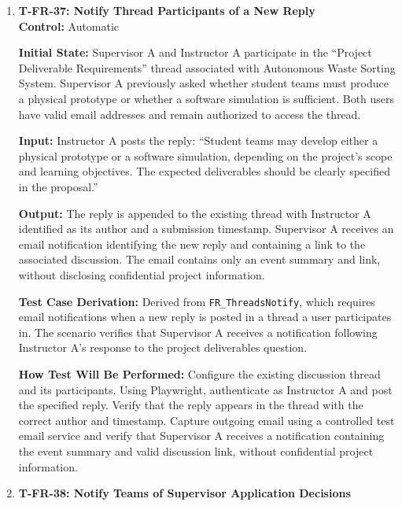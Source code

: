 \documentclass[12pt, titlepage]{article}
\begin{document}
\begin{enumerate}
\textbf{How Test Will Be Performed:} Using Playwright, authenticate as Student A and create both threads. Authenticate as Student B to reply to the team formation thread. Verify the content, authors, replies, and correct record associations.

\item \label{T-FR-37}\textbf{T-FR-37: Notify Thread Participants of a New Reply}\\

\textbf{Control:} Automatic

\textbf{Initial State:} Supervisor A and Instructor A participate in the ``Project Deliverable Requirements'' thread associated with Autonomous Waste Sorting System. Supervisor A previously asked whether student teams must produce a physical prototype or whether a software simulation is sufficient. Both users have valid email addresses and remain authorized to access the thread.

\textbf{Input:} Instructor A posts the reply: ``Student teams may develop either a physical prototype or a software simulation, depending on the project's scope and learning objectives. The expected deliverables should be clearly specified in the proposal.''

\textbf{Output:} The reply is appended to the existing thread with Instructor A identified as its author and a submission timestamp. Supervisor A receives an email notification identifying the new reply and containing a link to the associated discussion. The email contains only an event summary and link, without disclosing confidential project information.

\textbf{Test Case Derivation:} Derived from \texttt{FR\_ThreadsNotify}, which requires email notifications when a new reply is posted in a thread a user participates in. The scenario verifies that Supervisor A receives a notification following Instructor A's response to the project deliverables question.

\textbf{How Test Will Be Performed:} Configure the existing discussion thread and its participants. Using Playwright, authenticate as Instructor A and post the specified reply. Verify that the reply appears in the thread with the correct author and timestamp. Capture outgoing email using a controlled test email service and verify that Supervisor A receives a notification containing the event summary and valid discussion link, without confidential project information.

\item \label{T-FR-38}\textbf{T-FR-38: Notify Teams of Supervisor Application Decisions}\\


\end{enumerate}
\end{document}
